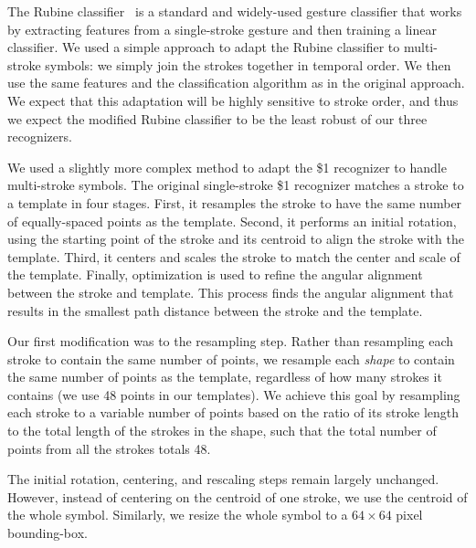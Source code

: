 \documentclass[final,5p,twocolumn]{elsarticle}
\begin{document}
The Rubine classifier~\cite{rubine} is a standard and widely-used
gesture classifier that works by extracting features from a
single-stroke gesture and then training a linear classifier.  We used
a simple approach to adapt the Rubine classifier to multi-stroke
symbols: we simply join the strokes together in temporal order.  We
then use the same features and the classification algorithm as in
the original approach.  We expect that this adaptation will be highly
sensitive to stroke order, and thus we expect the modified Rubine classifier to
be the least robust of our three recognizers.

We used a slightly more complex method to adapt 
the \$1 recognizer to handle multi-stroke
symbols.  The original single-stroke \$1 recognizer matches a stroke
to a template in four stages.  First, it resamples the
stroke to have the same number of equally-spaced points as the template.  
Second, it performs an initial rotation, using the
starting point of the stroke and its centroid to 
align the stroke with the template.
Third, it centers and scales the stroke to match the
center and scale of the template.  Finally, optimization
is used to refine the angular alignment between the
stroke and template. This process finds the 
angular alignment that results in the smallest path distance between
the stroke and the template.


Our first modification was to the resampling step.  Rather than
resampling each stroke to contain the same number of points, we
resample each \textit{shape} to contain the same number of points as
the template, regardless of how many strokes it contains (we use 48
points in our templates).  We achieve this goal by resampling each
stroke to a variable number of points based on the ratio of its
stroke length to the total length of the strokes in the shape, such
that the total number of points from all the strokes totals 48.

The initial rotation, centering, and rescaling steps remain largely
unchanged. However, instead of centering on the centroid of one stroke, we use
the centroid of the whole symbol. Similarly, we resize the whole
symbol to a $64\times 64$ pixel bounding-box.

\end{document}
